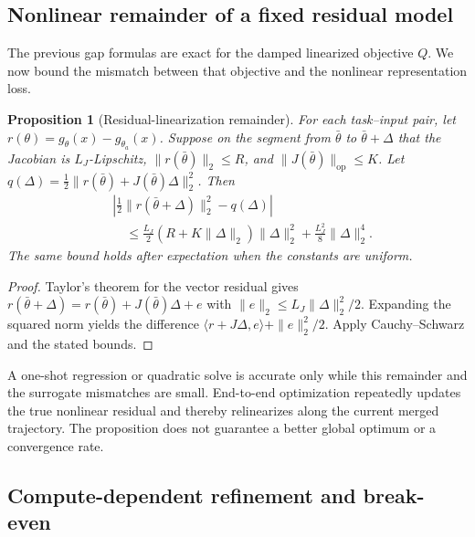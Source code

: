 \documentclass[letterpaper]{article} %
\theoremstyle{plain}
\newtheorem{proposition}[theorem]{Proposition}
\theoremstyle{definition}
\begin{document}
\subsection{Nonlinear remainder of a fixed residual model}
\label{app:nonlinear}

The previous gap formulas are exact for the damped linearized objective $Q$. We now bound
the mismatch between that objective and the nonlinear representation loss.

\begin{proposition}[Residual-linearization remainder]
\label{prop:nonlinear-remainder}
For each task--input pair, let
$r(\theta)=g_\theta(x)-g_{\theta_a}(x)$. Suppose on the segment from
$\bar\theta$ to $\bar\theta+\Delta$ that the Jacobian is $L_J$-Lipschitz,
$\|r(\bar\theta)\|_2\le R$, and $\|J(\bar\theta)\|_{\mathrm{op}}\le K$. Let
$q(\Delta)=\frac12\|r(\bar\theta)+J(\bar\theta)\Delta\|_2^2$. Then
\begin{align}
&\left|
\frac12\|r(\bar\theta+\Delta)\|_2^2-q(\Delta)
\right| \\
&\quad\le
\frac{L_J}{2}(R+K\|\Delta\|_2)\|\Delta\|_2^2
+\frac{L_J^2}{8}\|\Delta\|_2^4.
\label{eq:nonlinear-remainder}
\end{align}
The same bound holds after expectation when the constants are uniform.
\end{proposition}

\begin{proof}
Taylor's theorem for the vector residual gives
$r(\bar\theta+\Delta)=r(\bar\theta)+J(\bar\theta)\Delta+e$ with
$\|e\|_2\le L_J\|\Delta\|_2^2/2$. Expanding the squared norm yields the difference
$\langle r+J\Delta,e\rangle+\|e\|_2^2/2$. Apply Cauchy--Schwarz and the stated bounds.
\end{proof}

A one-shot regression or quadratic solve is accurate only while this remainder and the
surrogate mismatches are small. End-to-end optimization repeatedly updates the true
nonlinear residual and thereby relinearizes along the current merged trajectory. The
proposition does not guarantee a better global optimum or a convergence rate.

\subsection{Compute-dependent refinement and break-even}
\label{app:compute-error}
\end{document}
